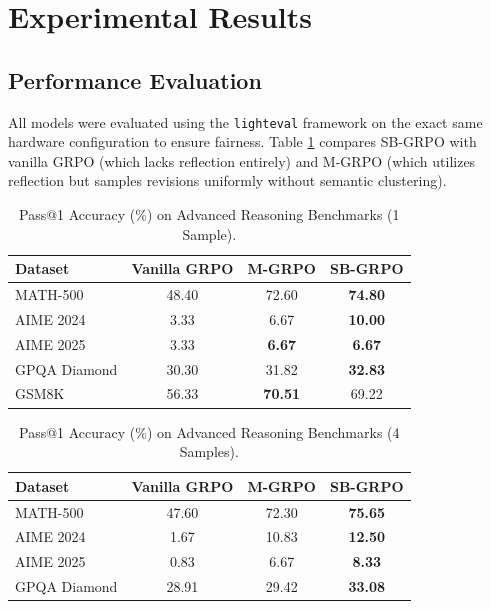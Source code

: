 \section{Experimental Results}

\subsection{Performance Evaluation}
All models were evaluated using the \texttt{lighteval} framework on the exact same hardware configuration to ensure fairness. Table \ref{tab:main} compares SB-GRPO with vanilla GRPO (which lacks reflection entirely) and M-GRPO (which utilizes reflection but samples revisions uniformly without semantic clustering).

\begin{table}[ht]
\centering
\caption{Pass@1 Accuracy (\%) on Advanced Reasoning Benchmarks (1 Sample).}
\label{tab:main}
\begin{tabular}{lccc}
\toprule
Dataset & Vanilla GRPO & M-GRPO & \textbf{SB-GRPO} \\
\midrule
MATH-500      & 48.40 & 72.60 & \textbf{74.80} \\
AIME 2024     & 3.33  & 6.67  & \textbf{10.00} \\
AIME 2025     & 3.33  & \textbf{6.67}  & \textbf{6.67}  \\
GPQA Diamond  & 30.30 & 31.82 & \textbf{32.83} \\
GSM8K         & 56.33 & \textbf{70.51} & 69.22 \\
\bottomrule
\end{tabular}
\end{table}

\begin{table}[ht]
\centering
\caption{Pass@1 Accuracy (\%) on Advanced Reasoning Benchmarks (4 Samples).}
\label{tab:pass4}
\begin{tabular}{lccc}
\toprule
Dataset & Vanilla GRPO & M-GRPO & \textbf{SB-GRPO} \\
\midrule
MATH-500      & 47.60 & 72.30 & \textbf{75.65} \\
AIME 2024     & 1.67  & 10.83 & \textbf{12.50} \\
AIME 2025     & 0.83  & 6.67  & \textbf{8.33}  \\
GPQA Diamond  & 28.91 & 29.42 & \textbf{33.08} \\
\bottomrule
\end{tabular}
\end{table}

